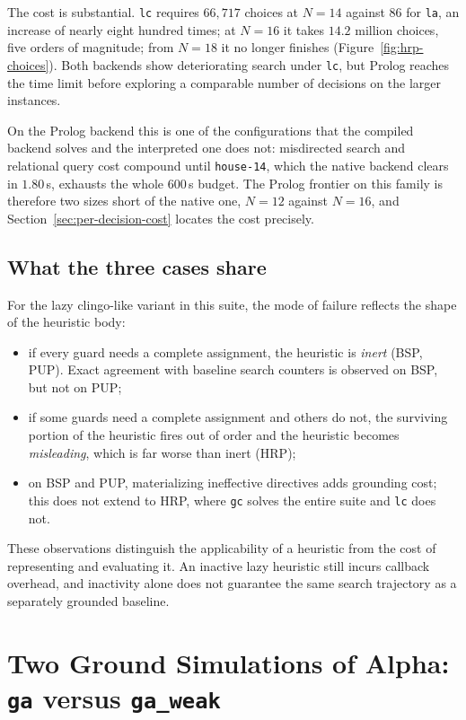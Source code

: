 The cost is substantial. \texttt{lc} requires $66{,}717$ choices at $N=14$ against $86$ for \texttt{la}, an increase of nearly eight hundred times; at $N=16$ it takes $14.2$ million choices, five orders of magnitude; from $N=18$ it no longer finishes (Figure~\ref{fig:hrp-choices}). Both backends show deteriorating search under \texttt{lc}, but Prolog reaches the time limit before exploring a comparable number of decisions on the larger instances.

On the Prolog backend this is one of the configurations that the compiled backend solves and the interpreted one does not: misdirected search and relational query cost compound until \texttt{house-14}, which the native backend clears in $1.80$\,s, exhausts the whole $600$\,s budget. The Prolog frontier on this family is therefore two sizes short of the native one, $N=12$ against $N=16$, and Section~\ref{sec:per-decision-cost} locates the cost precisely.

\subsection{What the three cases share}

For the lazy clingo-like variant in this suite, the mode of failure reflects the shape of the heuristic body:
\begin{itemize}[itemsep=2pt]
    \item if every guard needs a complete assignment, the heuristic is \emph{inert} (BSP, PUP). Exact agreement with baseline search counters is observed on BSP, but not on PUP;
    \item if some guards need a complete assignment and others do not, the surviving portion of the heuristic fires out of order and the heuristic becomes \emph{misleading}, which is far worse than inert (HRP);
    \item on BSP and PUP, materializing ineffective directives adds grounding cost; this does not extend to HRP, where \texttt{gc} solves the entire suite and \texttt{lc} does not.
\end{itemize}
These observations distinguish the applicability of a heuristic from the cost of representing and evaluating it. An inactive lazy heuristic still incurs callback overhead, and inactivity alone does not guarantee the same search trajectory as a separately grounded baseline.

\section{Two Ground Simulations of Alpha: \texttt{ga} versus \texttt{ga\_weak}}
\label{sec:ga-weak}

